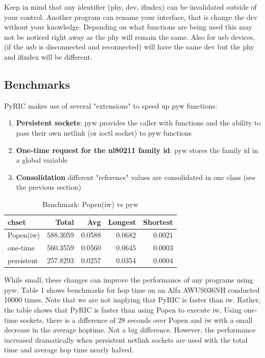 \documentclass[11pt]{article}
\begin{document}
Keep in mind that any identifier (phy, dev, ifindex) can be invalidated outside 
of your control. Another program can rename your interface, that is change the 
dev without your knowledge. Depending on what functions are being used this may 
not be noticed right away as the phy will remain the same. Also for usb devices, 
(if the usb is disconnected and reconnected) will have the same dev but the phy 
and ifindex will be different.

\subsection{Benchmarks}
PyRIC makes use of several "extensions" to speed up pyw functions:
\begin{enumerate}
\item \textbf{Persistent sockets}: pyw provides the caller with functions and 
the ability to pass their own netlink (or ioctl socket) to pyw functions
\item \textbf{One-time request for the nl80211 family id}: pyw stores the family
id in a global variable
\item \textbf{Consolidation} different "reference" values are consolidated in one
class (see the previous section)
\end{enumerate}

\begin{table}
\begin{center}
\begin{tabular}{| l | r | r | r | r|}
\hline
chset & Total & Avg & Longest & Shortest \\
\hline
Popen(iw) & 588.3059 & 0.0588 & 0.0682 & 0.0021 \\
\hline
one-time & 560.3559 & 0.0560 & 0.0645 & 0.0003 \\
\hline
persistent & 257.8293 & 0.0257 & 0.0354 & 0.0004 \\
\hline
\end{tabular}
\caption{Benchmark: Popen(iw) vs pyw} 
\end{center}
\label{tab:benchmark}
\end{table}

While small, these changes can improve the performance of any programs using pyw. 
Table 1 shows benchmarks for hop time on an Alfa AWUS036NH conducted 10000 times. 
Note that we are not implying that PyRIC is faster than iw. Rather, the table 
shows that PyRIC is faster than using Popen to execute iw. Using one-time sockets,
there is a difference of 28 seconds over Popen and iw with a small decrease in 
the average hoptime. Not a big difference. However, the performance increased
dramatically when persistent netlink sockets are used with the total time and 
average hop time nearly halved.
\end{document}
